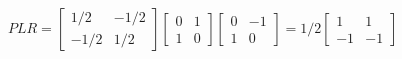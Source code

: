 \begin{SaveQuestion}
\begin{enumerate}
			$$PLR=\begin{bmatrix}
			1/2&-1/2  \\ -1/2 &1/2
			\end{bmatrix}\begin{bmatrix}
			0&1\\ 1&0
			\end{bmatrix}\begin{bmatrix}
			0&-1  \\ 1 &0
			\end{bmatrix}=1/2\begin{bmatrix}
			1& 1 \\ -1 &-1
			\end{bmatrix}	$$
			
  \end{enumerate}
\end{SaveQuestion}



